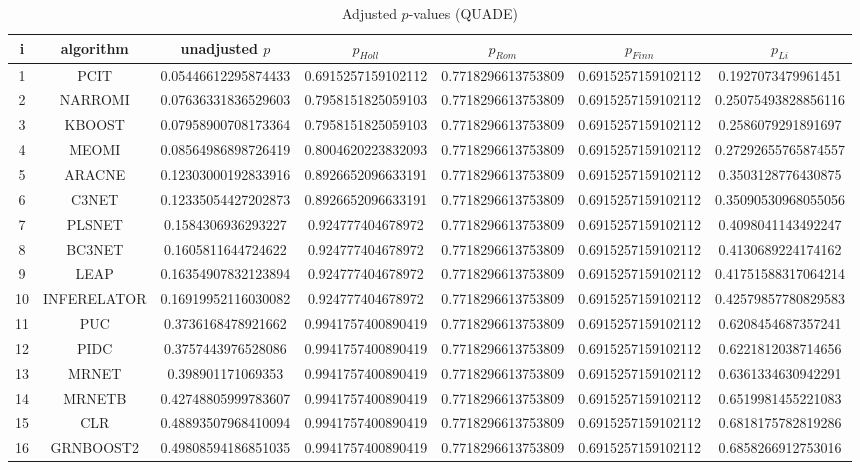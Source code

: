 \documentclass[a4paper,10pt]{article}
\begin{document}
\begin{landscape}
\begin{table}[!htp]
\centering\scriptsize
\caption{Adjusted $p$-values (QUADE)}
\begin{tabular}{ccccccc}
i&algorithm&unadjusted $p$&$p_{Holl}$&$p_{Rom}$&$p_{Finn}$&$p_{Li}$\\
\hline
1&PCIT&0.05446612295874433&0.6915257159102112&0.7718296613753809&0.6915257159102112&0.1927073479961451\\
2&NARROMI&0.07636331836529603&0.7958151825059103&0.7718296613753809&0.6915257159102112&0.25075493828856116\\
3&KBOOST&0.07958900708173364&0.7958151825059103&0.7718296613753809&0.6915257159102112&0.2586079291891697\\
4&MEOMI&0.08564986898726419&0.8004620223832093&0.7718296613753809&0.6915257159102112&0.27292655765874557\\
5&ARACNE&0.12303000192833916&0.8926652096633191&0.7718296613753809&0.6915257159102112&0.3503128776430875\\
6&C3NET&0.12335054427202873&0.8926652096633191&0.7718296613753809&0.6915257159102112&0.35090530968055056\\
7&PLSNET&0.1584306936293227&0.924777404678972&0.7718296613753809&0.6915257159102112&0.4098041143492247\\
8&BC3NET&0.1605811644724622&0.924777404678972&0.7718296613753809&0.6915257159102112&0.4130689224174162\\
9&LEAP&0.16354907832123894&0.924777404678972&0.7718296613753809&0.6915257159102112&0.41751588317064214\\
10&INFERELATOR&0.16919952116030082&0.924777404678972&0.7718296613753809&0.6915257159102112&0.42579857780829583\\
11&PUC&0.3736168478921662&0.9941757400890419&0.7718296613753809&0.6915257159102112&0.6208454687357241\\
12&PIDC&0.3757443976528086&0.9941757400890419&0.7718296613753809&0.6915257159102112&0.6221812038714656\\
13&MRNET&0.398901171069353&0.9941757400890419&0.7718296613753809&0.6915257159102112&0.6361334630942291\\
14&MRNETB&0.42748805999783607&0.9941757400890419&0.7718296613753809&0.6915257159102112&0.6519981455221083\\
15&CLR&0.48893507968410094&0.9941757400890419&0.7718296613753809&0.6915257159102112&0.6818175782819286\\
16&GRNBOOST2&0.49808594186851035&0.9941757400890419&0.7718296613753809&0.6915257159102112&0.6858266912753016\\

\end{tabular}
\end{table}
\end{landscape}
\end{document}
